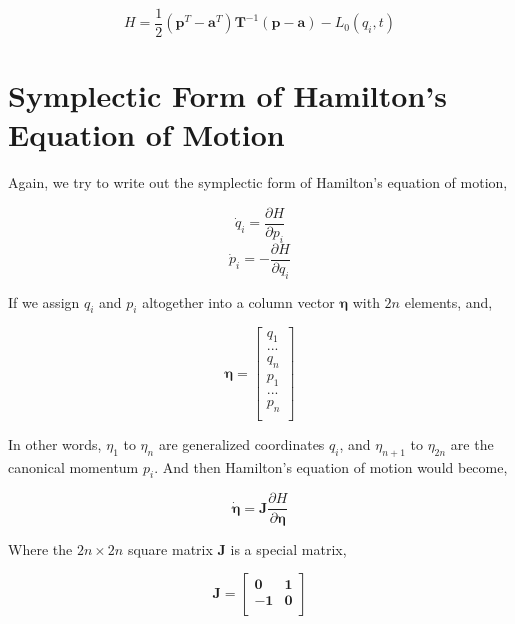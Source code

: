 \documentclass[12pt]{article}
\begin{document}
\begin{center}
    \[ H = \frac{1}{2}(\mathbf{p}^T - \mathbf{a}^T) \mathbf{T}^{-1} (\mathbf{p} - \mathbf{a}) - L_0(q_i, t) \]
\end{center}

\section{Symplectic Form of Hamilton's Equation of Motion}

Again, we try to write out the symplectic form of Hamilton's equation of motion,

\begin{center}
    \[ \dot{q}_i = \frac{\partial H}{\partial p_i} \]
    \[ \dot{p}_i = -\frac{\partial H}{\partial q_i}\]
\end{center}

If we assign $q_i$ and $p_i$ altogether into a column vector $\pmb{\eta}$ with $2n$ elements, and,

\begin{center}
    \[ \pmb{\eta} = \begin{bmatrix}
        q_1\\
        ...\\
        q_n\\
        p_1\\
        ...\\
        p_n\\
    \end{bmatrix}\]
\end{center}

In other words, $\eta_1$ to $\eta_n$ are generalized coordinates $q_i$, and $\eta_{n+1}$ to $\eta_{2n}$ are the canonical momentum $p_{i}$. And then Hamilton's equation of motion would become,

\begin{center}
    \[ \dot{\pmb{\eta}} = \pmb{J}\frac{\partial H}{\partial \pmb{\eta}}\]
\end{center}

Where the $2n \times 2n$ square matrix $\pmb{J}$ is a special matrix,

\begin{center}
    \[ \pmb{J} = \begin{bmatrix}
        \pmb{0} & \pmb{1}\\
        \pmb{-1} & \pmb{0}\\
    \end{bmatrix}\]
\end{center}
\end{document}
